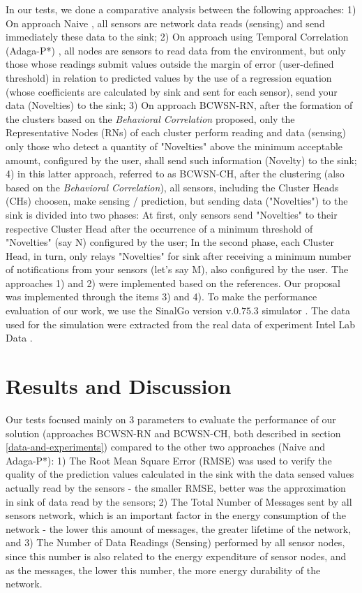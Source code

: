 \documentclass[conference]{IEEEtran}
\begin{document}
In our tests, we done a comparative analysis between the following approaches:
1) On approach Naive \cite{Madden2005}, all sensors are network data reads
(sensing) and send immediately these data to the sink; 2) On approach using
Temporal Correlation (Adaga-P*) \cite{MaiaACR2013} \cite{MaiaSAC2013}, all nodes
are sensors to read data from the environment, but only those whose readings
submit values outside the margin of error (user-defined threshold) in relation
to predicted values by the use of a regression equation (whose coefficients are
calculated by sink and sent for each sensor), send your data (Novelties) to the
sink; 3) On approach BCWSN-RN, after the formation of the clusters based on the
\textit{Behavioral Correlation} proposed, only the Representative Nodes (RNs) of
each cluster perform reading and data (sensing) only those who detect a quantity
of "Novelties" above the minimum acceptable amount, configured by the user, shall
send such information (Novelty) to the sink; 4) in this latter approach,
referred to as BCWSN-CH, after the clustering (also based on the
\textit{Behavioral Correlation}), all sensors, including the Cluster Heads (CHs)
choosen, make sensing / prediction, but sending data ("Novelties") to the sink is
divided into two phases: At first, only sensors send "Novelties" to their
respective Cluster Head after the occurrence of a minimum threshold of "Novelties"
(say N) configured by the user; In the second phase, each Cluster Head, in turn,
only relays "Novelties" for sink after receiving a minimum number of notifications
from your sensors (let's say M), also configured by the user.
The approaches 1) and 2) were implemented based on the references. Our proposal
was implemented through the items 3) and 4).
To make the performance evaluation of our work, we use the SinalGo version
v.$0.75.3$ simulator \cite{Sinalgo2007}. The data used for the simulation were
extracted from the real data of experiment Intel Lab Data \cite{Intel2004}.


\section{Results and Discussion}
\label{results-and-discussion}

Our tests focused mainly on 3 parameters to evaluate the performance of our
solution (approaches BCWSN-RN and BCWSN-CH, both described in section
\ref{data-and-experiments}) compared to the other two approaches (Naive and
Adaga-P*): 1) The Root Mean Square Error (RMSE) was used to verify the quality
of the prediction values calculated in the sink with the data sensed values
actually read by the sensors - the smaller RMSE, better was the approximation in
sink of data read by the sensors; 2) The Total Number of Messages sent by all
sensors network, which is an important factor in the energy consumption of the
network - the lower this amount of messages, the greater lifetime of the
network, and 3) The Number of Data Readings (Sensing) performed by all sensor
nodes, since this number is also related to the energy expenditure of sensor
nodes, and as the messages, the lower this number, the more energy durability of
the network.
\end{document}
